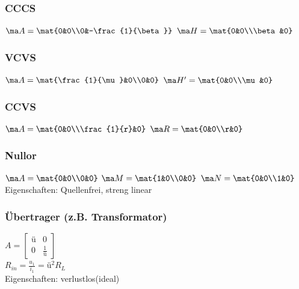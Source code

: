 \documentclass[fs, footer]{latex4ei}
\begin{document}
\begin{multicols*}{4}
		\subsubsection{CCCS}
		$\ma A = \mat{0&0\\0&-\frac{1}{\beta}}$\quad
		$\ma H = \mat{0&0\\\beta&0}$
		\subsubsection{VCVS}
		$\ma A = \mat{\frac{1}{\mu}&0\\0&0}$\quad
		$\ma H' = \mat{0&0\\\mu&0}$
		\subsubsection{CCVS}
		$\ma A = \mat{0&0\\\frac{1}{r}&0}$\quad
		$\ma R = \mat{0&0\\r&0}$

		\subsubsection{Nullor}
		$\ma A = \mat{0&0\\0&0}$\quad
		$\ma M = \mat{1&0\\0&0}$\quad
		$\ma N = \mat{0&0\\1&0}$\\
		Eigenschaften: Quellenfrei, streng linear

		\subsubsection{Übertrager (z.B. Transformator)}
		$A=\begin{bmatrix} \text{ü} & 0 \\ 0 & \frac{1}{\text{ü}} \end{bmatrix}$\\
		$R_{in}=\frac{u_1}{i_1}=\text{ü}^2 R_L$\\
		Eigenschaften: verlustlos(ideal)



\end{multicols*}
\end{document}
